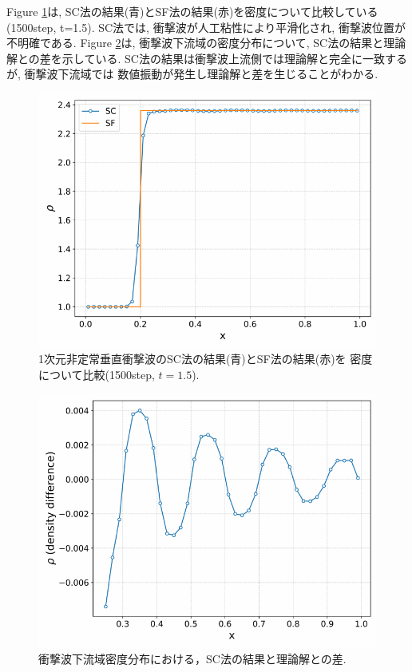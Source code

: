 \documentclass[a4j]{jarticle}
\begin{document}
Figure \ref{fig:1Dscsfa}は, SC法の結果(青)とSF法の結果(赤)を密度について比較している(1500step, t=1.5).
SC法では, 衝撃波が人工粘性により平滑化され, 衝撃波位置が不明確である.
Figure \ref{fig:1Dscsfb}は, 衝撃波下流域の密度分布について, SC法の結果と理論解との差を示している.
SC法の結果は衝撃波上流側では理論解と完全に一致するが, 衝撃波下流域では
数値振動が発生し理論解と差を生じることがわかる.
\begin{figure}[h]
  \centering
  \includegraphics[width=\linewidth]{1Dscsfa.pdf}
  \caption{%
    1次元非定常垂直衝撃波のSC法の結果(青)とSF法の結果(赤)を
    密度について比較(1500step, $t=1.5$).
  }
  \label{fig:1Dscsfa}
\end{figure}

\begin{figure}[h]
  \centering
  \includegraphics[width=\linewidth]{1Dscsfb.pdf}
  \caption{%
    衝撃波下流域密度分布における，SC法の結果と理論解との差.
  }
  \label{fig:1Dscsfb}
\end{figure}
\end{document}
